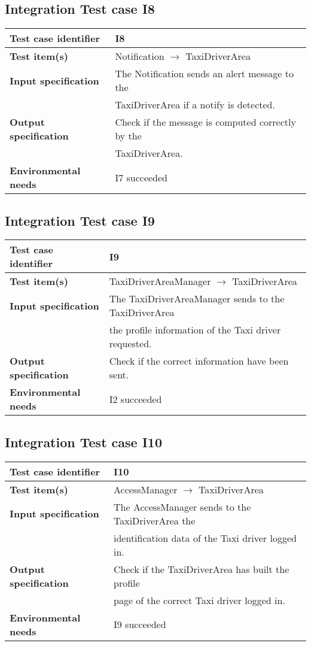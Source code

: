\documentclass[18pt,oneside,a4paper, titlepage]{article}
\begin{document}
	\subsection{Integration Test case I8}
		\begin{tabular}{ l l}
			\hline 		\textbf{Test case identifier} & I8 \\
			\hline		\textbf{Test item(s)}  & Notification $\rightarrow$ TaxiDriverArea \\
			\hline		\textbf{Input specification} & The Notification sends an alert message to the \\ & TaxiDriverArea if a notify is detected.\\
			\hline		\textbf{Output specification} & Check if the message is computed correctly by the\\ & TaxiDriverArea.\\
			\hline		\textbf{Environmental needs} & I7 succeeded\\
			\hline
		\end{tabular}
	\subsection{Integration Test case I9}
		\begin{tabular}{ l l}
			\hline 		\textbf{Test case identifier} & I9 \\
			\hline		\textbf{Test item(s)}  & TaxiDriverAreaManager $\rightarrow$ TaxiDriverArea \\
			\hline		\textbf{Input specification} & The TaxiDriverAreaManager sends to the TaxiDriverArea\\ & the profile information of the Taxi driver requested.\\
			\hline		\textbf{Output specification} & Check if the correct information have been sent.\\
			\hline		\textbf{Environmental needs} & I2 succeeded\\
			\hline
		\end{tabular}
	\subsection{Integration Test case I10}
		\begin{tabular}{ l l}
			\hline 		\textbf{Test case identifier} & I10 \\
			\hline		\textbf{Test item(s)}  & AccessManager $\rightarrow$ TaxiDriverArea \\
			\hline		\textbf{Input specification} & The AccessManager sends to the TaxiDriverArea the\\ & identification data of the Taxi driver logged in.\\
			\hline		\textbf{Output specification} & Check if the TaxiDriverArea has built the profile\\ & page of the correct Taxi driver logged in.\\
			\hline		\textbf{Environmental needs} & I9 succeeded\\
			\hline
		\end{tabular}
\end{document}
